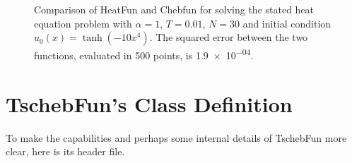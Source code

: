\documentclass[12pt, a4paper]{article}
\begin{document}
  \begin{figure}[H]
    \centering
    \caption{Comparison of HeatFun and Chebfun for solving the stated heat equation problem with $\alpha = 1$, $T = 0.01$, $N = 30$ and initial condition $u_0(x) = \tanh(-10x^4)$. The squared error between the two functions, evaluated in 500 points, is \num{1.9e-04}.}
  \end{figure}

  \section*{TschebFun's Class Definition}
  To make the capabilities and perhaps some internal details of \textcolor{themecolor3}{TschebFun} more clear, here is its header file.
  \inputminted{cpp}{../solver/TschebFun.h}
\end{document}
